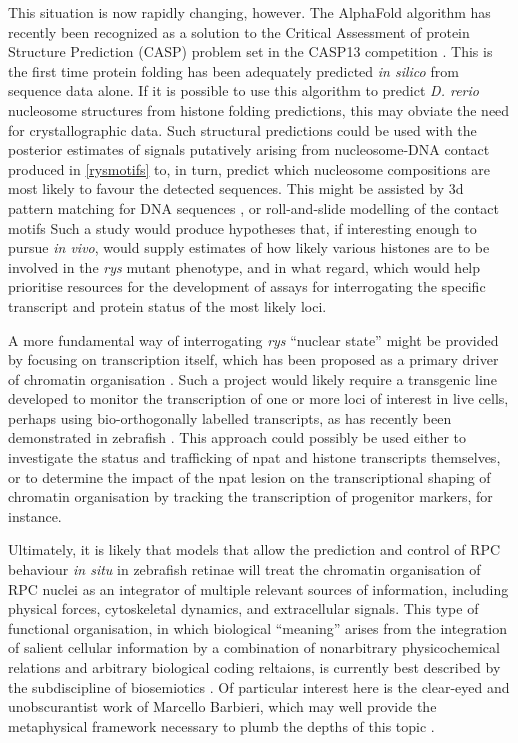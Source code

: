 This situation is now rapidly changing, however. The AlphaFold algorithm has recently been recognized as a solution to the Critical Assessment of protein Structure Prediction (CASP) problem set in the CASP13 competition \cite{AlQuraishi2019}. This is the first time protein folding has been adequately predicted \textit{in silico} from sequence data alone. If it is possible to use this algorithm to predict \textit{D. rerio} nucleosome structures from histone folding predictions, this may obviate the need for crystallographic data. Such structural predictions could be used with the posterior estimates of signals putatively arising from nucleosome-DNA contact produced in \autoref{rysmotifs} to, in turn, predict which nucleosome compositions are most likely to favour the detected sequences. This might be assisted by 3d pattern matching for DNA sequences \cite{Herisson2007}, or roll-and-slide modelling of the contact motifs \cite{Tolstorukov2007} Such a study would produce hypotheses that, if interesting enough to pursue \textit{in vivo}, would supply estimates of how likely various histones are to be involved in the \textit{rys} mutant phenotype, and in what regard, which would help prioritise resources for the development of assays for interrogating the specific transcript and protein status of the most likely loci.

A more fundamental way of interrogating \textit{rys} ``nuclear state'' might be provided by focusing on transcription itself, which has been proposed as a primary driver of chromatin organisation \cite{Cook2018}. Such a project would likely require a transgenic line developed to monitor the transcription of one or more loci of interest in live cells, perhaps using bio-orthogonally labelled transcripts, as has recently been demonstrated in zebrafish \cite{Westerich2020}. This approach could possibly be used either to investigate the status and trafficking of npat and histone transcripts themselves, or to determine the impact of the npat lesion on the transcriptional shaping of chromatin organisation by tracking the transcription of progenitor markers, for instance.

Ultimately, it is likely that models that allow the prediction and control of RPC behaviour \textit{in situ} in zebrafish retinae will treat the chromatin organisation of RPC nuclei as an integrator of multiple relevant sources of information, including physical forces, cytoskeletal dynamics, and extracellular signals. This type of functional organisation, in which biological ``meaning'' arises from the integration of salient cellular information by a combination of nonarbitrary physicochemical relations and arbitrary biological coding reltaions, is currently best described by the subdiscipline of biosemiotics \cite{Hoffmeyer2008,Favareau2015,Hoffmeyer2015}. Of particular interest here is the clear-eyed and unobscurantist work of Marcello Barbieri, which may well provide the metaphysical framework necessary to plumb the depths of this topic \cite{Barbieri2014}.